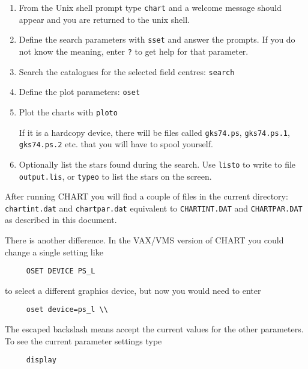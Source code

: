 \documentclass{article}
\begin{document}
\begin{enumerate}

\item From the Unix shell prompt type \texttt{chart} and a welcome message should appear and you are returned to the unix shell.

\item Define the search parameters with \texttt{sset}
and answer the prompts. If you do not know the meaning, enter \texttt{?} to
get help for that parameter.

\item Search the catalogues for the selected field centres: \texttt{search}

\item Define the plot parameters: \texttt{oset}

\item Plot the charts with \texttt{ploto}

If it is a hardcopy device, there will be files called
\texttt{gks74.ps}, \texttt{gks74.ps.1}, \texttt{gks74.ps.2} etc. that
you will have to spool yourself.

\item  Optionally list the stars found during the search. Use
 \texttt{listo} to write to file \texttt{output.lis}, or
 \texttt{typeo} to list the stars on the screen.

\end{enumerate}

After running CHART you will find a couple of files in the current
directory: \texttt{chartint.dat} and \texttt{chartpar.dat} equivalent
to \texttt{CHARTINT.DAT} and \texttt{CHARTPAR.DAT} as described in
this document.

There is another difference. In the VAX/VMS version of CHART you could
change a single setting like

\begin{verbatim}
     OSET DEVICE PS_L
\end{verbatim}

to select a different graphics device, but now you would need to enter

\begin{verbatim}
     oset device=ps_l \\
\end{verbatim}

The  escaped  backslash  means accept the current values for the other
parameters. To see the current parameter settings type

\begin{verbatim}
     display
\end{verbatim}
\end{document}
